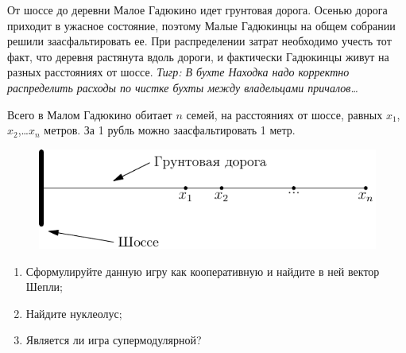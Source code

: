 \begin{problem}
От шоссе до деревни Малое Гадюкино идет грунтовая дорога. Осенью дорога приходит в ужасное состояние, поэтому Малые Гадюкинцы на общем собрании решили заасфальтировать ее. При распределении затрат необходимо учесть тот факт, что деревня растянута вдоль дороги, и фактически Гадюкинцы живут на разных расстояниях от шоссе.
{\it Тигр:  В бухте Находка надо корректно распределить расходы по чистке бухты между владельцами причалов\ldots }

Всего в Малом Гадюкино обитает  $n$  семей, на расстояниях от шоссе, равных  $x_{1}$,  $x_{2}$,\ldots  $x_{n}$ метров. За 1 рубль можно заасфальтировать 1 метр.


\begin{figure}[htbp]
	\includegraphics{coop_gadukino.pdf}
\end{figure}





\begin{enumerate}
\item Сформулируйте данную игру как кооперативную и найдите в ней вектор Шепли;
\item Найдите нуклеолус;
\item Является ли игра супермодулярной?
\end{enumerate}



\begin{sol}

\end{sol}
\end{problem}



